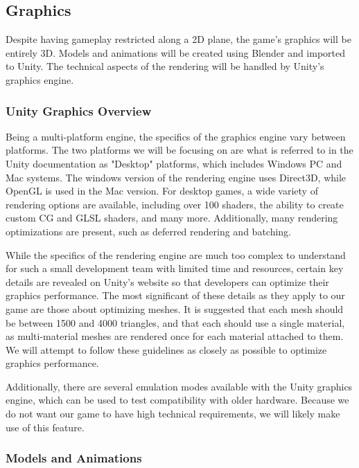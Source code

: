 \documentclass{article}
\begin{document}
\subsection{Graphics}

Despite having gameplay restricted along a 2D plane, the game's graphics will be entirely 3D.  Models and animations will be created using Blender and imported to Unity.  The technical aspects of the rendering will be handled by Unity's graphics engine.

\subsubsection{Unity Graphics Overview}

Being a multi-platform engine, the specifics of the graphics engine vary between platforms.  The two platforms we will be focusing on are what is referred to in the Unity documentation as "Desktop" platforms, which includes Windows PC and Mac systems.  The windows version of the rendering engine uses Direct3D, while OpenGL is used in the Mac version.  For desktop games, a wide variety of rendering options are available, including over 100 shaders, the ability to create custom CG and GLSL shaders, and many more.  Additionally, many rendering optimizations are present, such as deferred rendering and batching.

While the specifics of the rendering engine are much too complex to understand for such a small development team with limited time and resources, certain key details are revealed on Unity's website so that developers can optimize their graphics performance.  The most significant of these details as they apply to our game are those about optimizing meshes.  It is suggested that each mesh should be between 1500 and 4000 triangles, and that each should use a single material, as multi-material meshes are rendered once for each material attached to them.  We will attempt to follow these guidelines as closely as possible to optimize graphics performance.

Additionally, there are several emulation modes available with the Unity graphics engine, which can be used to test compatibility with older hardware.  Because we do not want our game to have high technical requirements, we will likely make use of this feature.

\subsubsection{Models and Animations}
\end{document}
